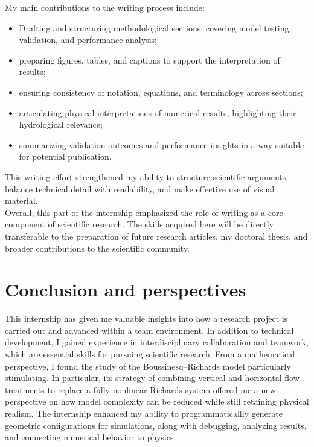 \documentclass[12pt,a4paper]{article}
\begin{document}
My main contributions to the writing process include:
\begin{itemize}
    \item Drafting and structuring methodological sections, covering model testing, validation, and performance analysis;
    \item preparing figures, tables, and captions to support the interpretation of results;
    \item ensuring consistency of notation, equations, and terminology across sections;
    \item articulating physical interpretations of numerical results, highlighting their hydrological relevance;
    \item summarizing validation outcomes and performance insights in a way suitable for potential publication. 
\end{itemize}

This writing effort strengthened my ability to structure scientific arguments, balance technical detail with readability, and make effective use of visual material.\\  

Overall, this part of the internship emphasized the role of writing as a core component of scientific research.  
The skills acquired here will be directly transferable to the preparation of future research articles, my doctoral thesis, and broader contributions to the scientific community.\\





\section{Conclusion and perspectives}

This internship has given me valuable insights into how a research project is carried out and advanced within a team environment.
In addition to technical development, I gained experience in interdisciplinary collaboration and teamwork, which are essential skills for pursuing scientific research.
From a mathematical perspective, I found the study of the Boussinesq–Richards model particularly stimulating.
In particular, its strategy of combining vertical and horizontal flow treatments to replace a fully nonlinear Richards system offered me a new perspective on how model complexity can be reduced while still retaining physical realism.
The internship enhanced my ability to programmaticallly generate geometric configurations for simulations, along with debugging, analyzing results, and connecting numerical behavior to physics.\\  
\end{document}
